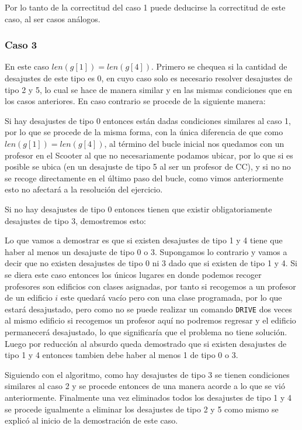 \documentclass[11pt]{article}
\begin{document}
    Por lo tanto de la correctitud del caso 1 puede deducirse la correctitud de este caso, al ser casos análogos.

    \subsubsection{Caso 3}
    En este caso $len(g[1]) = len(g[4])$. Primero se chequea si la cantidad de desajustes de este tipo es 0, en cuyo caso solo
    es necesario resolver desajustes de tipo 2 y 5, lo cual se hace de manera similar y en las mismas condiciones que en los
    casos anteriores. En caso contrario se procede de la siguiente manera:

    Si hay desajustes de tipo 0 entonces están dadas condiciones similares al caso 1, por lo que se procede de la misma forma,
    con la única diferencia de que como $len(g[1]) = len(g[4])$, al término del bucle inicial nos quedamos con un profesor en
    el Scooter al que no necesariamente podamos ubicar, por lo que si es posible se ubica (en un desajuste de tipo 5 al ser un
    profesor de CC), y si no no se recoge directamente en el último paso del bucle, como vimos anteriormente esto no afectará
    a la resolución del ejercicio.

    Si no hay desajustes de tipo 0 entonces tienen que existir obligatoriamente desajustes de tipo 3, demostremos esto:

    Lo que vamos a demostrar es que si existen desajustes de tipo 1 y 4 tiene que haber al menos un desajuste de tipo 0 o 3.
    Supongamos lo contrario y vamos a decir que no existen desajustes de tipo 0 ni 3 dado que si existen de tipo 1 y 4. Si se
    diera este caso entonces los únicos lugares en donde podemos recoger profesores son edificios con clases asignadas, por tanto
    si recogemos a un profesor de un edificio $i$ este quedará vacío pero con una clase programada, por lo que estará desajustado,
    pero como no se puede realizar un comando \texttt{DRIVE} dos veces al mismo edificio si recogemos un profesor aquí no podremos
    regresar y el edificio permanecerá desajustado, lo que significaría que el problema no tiene solución. Luego por reducción al
    absurdo queda demostrado que si existen desajustes de tipo 1 y 4 entonces tambien debe haber al menos 1 de tipo 0 o 3.

    Siguiendo con el algoritmo, como hay desajustes de tipo 3 se tienen condiciones similares al caso 2 y se procede entonces de
    una manera acorde a lo que se vió anteriormente. Finalmente una vez eliminados todos los desajustes de tipo 1 y 4 se procede
    igualmente a eliminar los desajustes de tipo 2 y 5 como mismo se explicó al inicio de la demostración de este caso.
\end{document}

